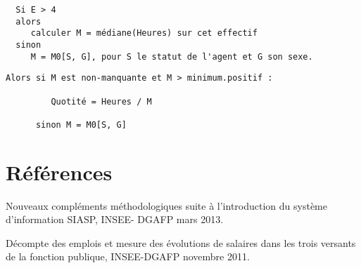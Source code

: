\documentclass[]{article}
\begin{document}
\begin{verbatim}
  Si E > 4  
  alors 
     calculer M = médiane(Heures) sur cet effectif
  sinon
     M = M0[S, G], pour S le statut de l'agent et G son sexe.   
\end{verbatim}

\begin{verbatim}
Alors si M est non-manquante et M > minimum.positif :  

         Quotité = Heures / M

      sinon M = M0[S, G]   
\end{verbatim}

\section{Références}\label{references}

Nouveaux compléments méthodologiques suite à l'introduction du système
d'information SIASP, INSEE- DGAFP mars 2013.

Décompte des emplois et mesure des évolutions de salaires dans les trois
versants de la fonction publique, INSEE-DGAFP novembre 2011.
\end{document}
